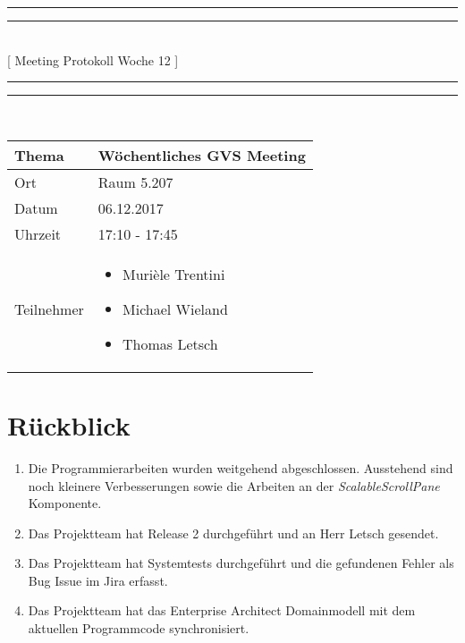 \documentclass[11pt, a4paper,oneside]{scrartcl}
\begin{document}
	\centering
	\rule{\textwidth}{1.6pt}\vspace*{-\baselineskip}\vspace*{2pt} %
	\rule{\textwidth}{0.4pt}\\[\baselineskip] %
	{\LARGE [ Meeting Protokoll Woche 12 ]}\\[0.2\baselineskip] %
	\rule{\textwidth}{0.4pt}\vspace*{-\baselineskip}\vspace{3.2pt} %
	\rule{\textwidth}{1.6pt}\\[2\baselineskip] %
	
	\begin{tabu} to \linewidth {l X }
		\toprule
		\textbf{Thema} & \textbf{Wöchentliches GVS Meeting} \\
		\midrule
		Ort & Raum 5.207 \\
		Datum & 06.12.2017  \\
		Uhrzeit &  17:10 - 17:45 \\
		Teilnehmer & 
		\begin{minipage}[t]{\textwidth}
			\begin{itemize}
				\item Murièle Trentini
				\item Michael Wieland
				\item Thomas Letsch
			\end{itemize}
		\end{minipage}
		\\
		\bottomrule
	\end{tabu}
	
	
	\section{Rückblick}
	\begin{enumerate}
		\item Die Programmierarbeiten wurden weitgehend abgeschlossen. Ausstehend sind noch kleinere Verbesserungen sowie die Arbeiten an der \textit{ScalableScrollPane} Komponente.
		\item Das Projektteam hat Release 2 durchgeführt und an Herr Letsch gesendet.
		\item Das Projektteam hat Systemtests durchgeführt und die gefundenen Fehler als Bug Issue im Jira erfasst.
		\item Das Projektteam hat das Enterprise Architect Domainmodell mit dem aktuellen Programmcode synchronisiert.
	\end{enumerate}
	
\end{document}
